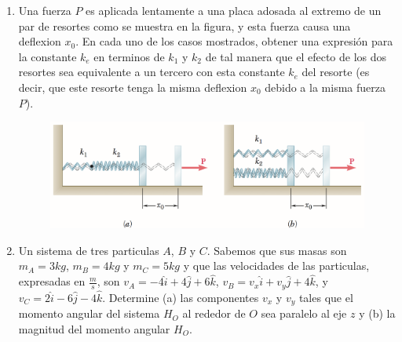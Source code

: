 \begin{enumerate}
	\item Una fuerza $P$ es aplicada lentamente a una placa adosada al extremo de un par de resortes como se muestra en la figura, y esta fuerza causa una deflexion $x_0$. En cada uno de los casos mostrados, obtener una expresión para la constante $k_e$ en terminos de $k_1$ y $k_2$ de tal manera que el efecto de los dos resortes sea equivalente a un tercero con esta constante $k_e$ del resorte (es decir, que este resorte tenga la misma deflexion $x_0$ debido a la misma fuerza $P$).

	\begin{figure}
		\begin{center}
			\includegraphics[width=\textwidth]{./images/resortes.png}
		\end{center}
	\end{figure}

	\item Un sistema de tres particulas $A$, $B$ y $C$. Sabemos que sus masas son $m_A = 3 kg$, $m_B = 4 kg$ y $m_C = 5 kg$ y que las velocidades de las particulas, expresadas en $\frac{m}{s}$, son $v_A = -4 \hat{i} + 4 \hat{j} + 6 \hat{k}$, $v_B = v_x \hat{i} + v_y \hat{j} + 4 \hat{k}$, y $v_C = 2\hat{i} - 6\hat{j} - 4\hat{k}$. Determine (a) las componentes $v_x$ y $v_y$ tales que el momento angular del sistema $H_O$ al rededor de $O$ sea paralelo al eje $z$ y (b) la magnitud del momento angular $H_O$.


\end{enumerate}
